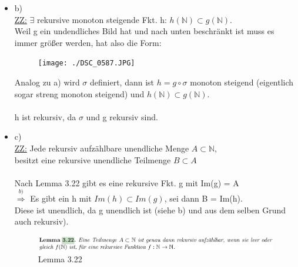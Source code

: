 \documentclass[a4paper]{scrartcl}%
\begin{document}
\begin{itemize}
\newpage

        \item b)\\
            \underline{ZZ:} $\exists$ rekursive monoton steigende Fkt. h: $h( \mathds{N} ) \subset g( \mathds{N} )$.\\
            Weil g ein undendliches Bild hat und nach unten beschränkt ist muss es immer größer werden, hat also die Form:\\
            \begin{figure}[H]
                \centering
                \texttt{[image: ./DSC\_0587.JPG]}
                \label{fig:./DSC_0587}
            \end{figure}
            Analog zu a) wird $\sigma$ definiert, dann ist $h = g \circ \sigma$ monoton steigend (eigentlich sogar streng monoton steigend) 
            und $h( \mathds{N}) \subset g( \mathds{N})$.\\
            \\h ist rekursiv, da $\sigma$ und g rekursiv sind.\\
        \item c)\\
            \underline{ZZ:} Jede rekursiv aufzählbare unendliche Menge $A \subset \mathds{N}$,\\
            besitzt eine rekursive unendliche Teilmenge $B \subset A$\\
            \\Nach Lemma 3.22 gibt es eine rekursive Fkt. g mit Im(g) = A\\
            $\overset{b)}{\Rightarrow}$ Es gibt ein h mit $Im(h) \subset Im(g)$, sei dann B = Im(h).\\
            Diese ist unendlich, da g unendlich ist (siehe b) und aus dem selben Grund auch rekursiv).\\
            \begin{figure}[H]
                \centering
                \includegraphics[scale=0.3]{./L-3-22.png}
                \caption{Lemma 3.22}
                \label{fig:./L-3-22}
            \end{figure}
    \end{itemize}%


\section*{}
\label{sec:aufgabe_3}
\end{document}
